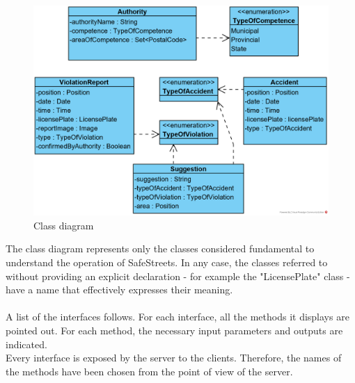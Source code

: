\documentclass{article}
\begin{document}
		\begin{figure}[H]
			\includegraphics {diagrams/class_diagram.png}
			\caption[Class diagram]{Class diagram}
			\label{fig:class_diagram}
		\end{figure}
	
		The class diagram represents only the classes considered fundamental to understand the operation of SafeStreets. In any case, the classes referred to without providing an explicit declaration - for example the "LicensePlate" class - have a name that effectively expresses their meaning.\\
		\\
		A list of the interfaces follows. For each interface, all the methods it displays are pointed out. For each method, the necessary input parameters and outputs are indicated.\\
		Every interface is exposed by the server to the clients. Therefore, the names of the methods have been chosen from the point of view of the server.\\
		
\end{document}

